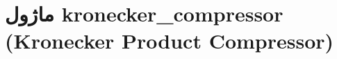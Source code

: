 \section{ماژول kronecker\_compressor (Kronecker Product Compressor)}
\label{sec:module_kronecker_compressor}
